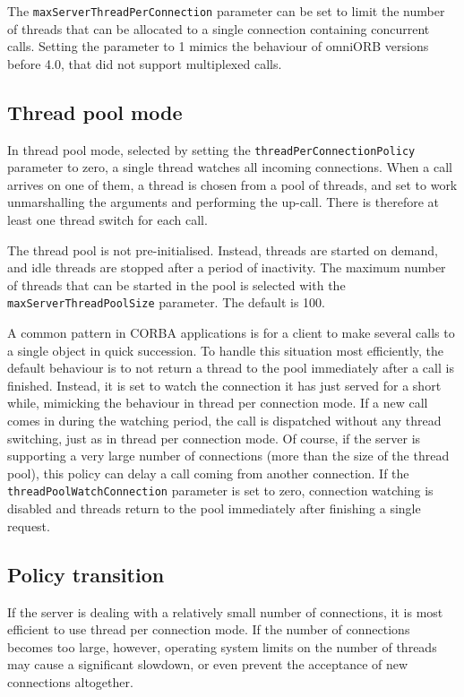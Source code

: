 \documentclass[11pt,twoside,a4paper]{book}
\newcommand{\code}[1]{\texttt{#1}}
\newcommand{\dsc}{\discretionary{}{}{}}
\begin{document}
The \code{maxServerThreadPerConnection} parameter can be set to limit
the number of threads that can be allocated to a single connection
containing concurrent calls. Setting the parameter to 1 mimics the
behaviour of omniORB versions before 4.0, that did not support
multiplexed calls.


\subsection{Thread pool mode}
\label{sec:watchConn}

In thread pool mode, selected by setting the
\code{threadPerConnectionPolicy} parameter to zero, a single thread
watches all incoming connections. When a call arrives on one of them,
a thread is chosen from a pool of threads, and set to work
unmarshalling the arguments and performing the up-call. There is
therefore at least one thread switch for each call.

The thread pool is not pre-initialised. Instead, threads are started
on demand, and idle threads are stopped after a period of inactivity.
The maximum number of threads that can be started in the pool is
selected with the \code{maxServerThreadPool\dsc{}Size} parameter. The
default is 100.

A common pattern in CORBA applications is for a client to make several
calls to a single object in quick succession. To handle this situation
most efficiently, the default behaviour is to not return a thread to
the pool immediately after a call is finished. Instead, it is set to
watch the connection it has just served for a short while, mimicking
the behaviour in thread per connection mode. If a new call comes in
during the watching period, the call is dispatched without any thread
switching, just as in thread per connection mode. Of course, if the
server is supporting a very large number of connections (more than the
size of the thread pool), this policy can delay a call coming from
another connection. If the \code{threadPoolWatch\dsc{}Connection}
parameter is set to zero, connection watching is disabled and threads
return to the pool immediately after finishing a single request.


\subsection{Policy transition}

If the server is dealing with a relatively small number of
connections, it is most efficient to use thread per connection mode.
If the number of connections becomes too large, however, operating
system limits on the number of threads may cause a significant
slowdown, or even prevent the acceptance of new connections
altogether.
\end{document}
